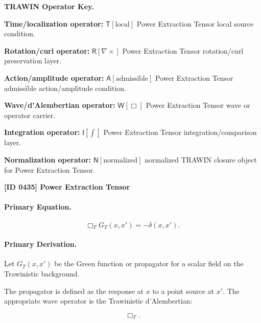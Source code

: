 \par\vspace{0.45\baselineskip}
\noindent\begin{minipage}[t]{\linewidth}
\begingroup
\small
\raggedright
\textbf{TRAWIN Operator Key.}\par
\noindent\textbf{Time/localization operator:} $\mathsf{T}\!\left[\mathrm{local}\right]$ Power Extraction Tensor local source condition.\par
\noindent\textbf{Rotation/curl operator:} $\mathsf{R}\!\left[\nabla\times\right]$ Power Extraction Tensor rotation/curl preservation layer.\par
\noindent\textbf{Action/amplitude operator:} $\mathsf{A}\!\left[\mathrm{admissible}\right]$ Power Extraction Tensor admissible action/amplitude condition.\par
\noindent\textbf{Wave/d'Alembertian operator:} $\mathsf{W}\!\left[\Box\right]$ Power Extraction Tensor wave or operator carrier.\par
\noindent\textbf{Integration operator:} $\mathsf{I}\!\left[\int\right]$ Power Extraction Tensor integration/comparison layer.\par
\noindent\textbf{Normalization operator:} $\mathsf{N}\!\left[\mathrm{normalized}\right]$ normalized TRAWIN closure object for Power Extraction Tensor.\par
\endgroup
\end{minipage}

\clearpage
\noindent\textbf{[ID 0435] Power Extraction Tensor}\par
\vspace{0.35em}
\paragraph{Primary Equation.}
\begin{equation}
\Box_T G_T(x,x')
=
-\delta(x,x') .
\end{equation}

\paragraph{Primary Derivation.}
Let $G_T(x,x')$ be the Green function or propagator for a scalar field on the Trawinistic background.

The propagator is defined as the response at $x$ to a point source at $x'$.  
The appropriate wave operator is the Trawinistic d'Alembertian:

\begin{equation}
\Box_T .
\end{equation}

